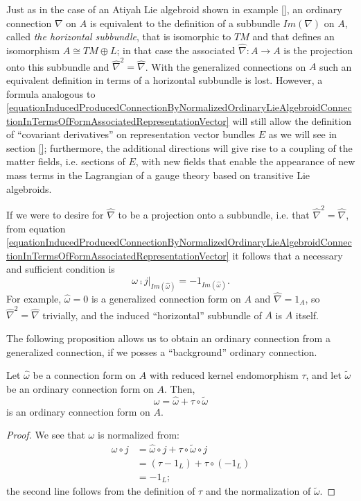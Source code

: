 \begin{remark}
Just as in the case of an Atiyah Lie algebroid shown in example \ref{}, an ordinary connection $\nabla$ on $A$ is equivalent to the definition of a subbundle $Im(\nabla)$ on $A$, called \emph{the horizontal subbundle}, that is isomorphic to $TM$ and that defines an isomorphism $A \cong TM \oplus L$; in that case the associated $\hat \nabla: A \to A$ is the projection onto this subbundle and $\hat \nabla^2 = \hat \nabla$. With the generalized connections on $A$ such an equivalent definition in terms of a horizontal subbundle is lost. However, a formula analogous to \eqref{equationInducedProducedConnectionByNormalizedOrdinaryLieAlgebroidConnectionInTermsOfFormAssociatedRepresentationVector} will still allow the definition of ``covariant derivatives'' on representation vector bundles $E$ as we will see in section \ref{}; furthermore, the additional directions will give rise to a coupling of the matter fields, i.e. sections of $E$, with new fields that enable the appearance of new mass terms in the Lagrangian of a gauge theory based on transitive Lie algebroids.

If we were to desire for $\hat \nabla$ to be a projection onto a subbundle, i.e. that $\hat \nabla^2 = \hat \nabla$, from equation \eqref{equationInducedProducedConnectionByNormalizedOrdinaryLieAlgebroidConnectionInTermsOfFormAssociatedRepresentationVector} it follows that a necessary and sufficient condition is 
\begin{equation}\label{equationEquivalentNecessarySufficientGeneralizedConnectionBeDefineHorizontalProjectionSubbundle}
    \omega \comp j|_{Im(\hat \omega)} = - 1_{Im(\hat \omega)}.
\end{equation}
For example, $\hat \omega = 0$ is a generalized connection form on $A$ and $\hat \nabla = 1_A$, so $\hat \nabla^2 = \hat \nabla$ trivially, and the induced ``horizontal'' subbundle of $A$ is $A$ itself.
\end{remark}

The following proposition allows us to obtain an ordinary connection from a generalized connection, if we posses a ``background'' ordinary connection.

\begin{proposition}
Let $\hat \omega$ be a connection form on $A$ with reduced kernel endomorphism $\tau$, and let $\tilde \omega$ be an ordinary connection form on $A$. Then,
\begin{equation}
    \omega = \hat \omega + \tau \circ \tilde \omega
\end{equation}
is an ordinary connection form on $A$.
\end{proposition}
\begin{proof}
We see that $\omega$ is normalized from:
\begin{align*}
    \omega \circ j &= \hat \omega \circ j + \tau \circ \tilde \omega \circ j\\
        &= (\tau - 1_L) + \tau \circ (-1_L) \\
        &= -1_L;
\end{align*}
the second line follows from the definition of $\tau$ and the normalization of $\tilde \omega$.
\end{proof}

